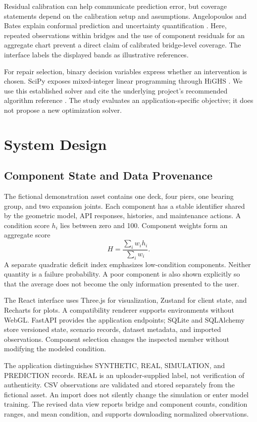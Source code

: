 \documentclass[conference]{IEEEtran}
\begin{document}
Residual calibration can help communicate prediction error, but coverage statements depend on the calibration setup and assumptions. Angelopoulos and Bates explain conformal prediction and uncertainty quantification \cite{angelopoulos}. Here, repeated observations within bridges and the use of component residuals for an aggregate chart prevent a direct claim of calibrated bridge-level coverage. The interface labels the displayed bands as illustrative references.

For repair selection, binary decision variables express whether an intervention is chosen. SciPy exposes mixed-integer linear programming through HiGHS \cite{scipy_milp}. We use this established solver and cite the underlying project's recommended algorithm reference \cite{highs}. The study evaluates an application-specific objective; it does not propose a new optimization solver.

\section{System Design}
\subsection{Component State and Data Provenance}
The fictional demonstration asset contains one deck, four piers, one bearing group, and two expansion joints. Each component has a stable identifier shared by the geometric model, API responses, histories, and maintenance actions. A condition score $h_i$ lies between zero and 100. Component weights form an aggregate score
\begin{equation}
H=\frac{\sum_i w_i h_i}{\sum_i w_i}.
\end{equation}
A separate quadratic deficit index emphasizes low-condition components. Neither quantity is a failure probability. A poor component is also shown explicitly so that the average does not become the only information presented to the user.

The React interface uses Three.js for visualization, Zustand for client state, and Recharts for plots. A compatibility renderer supports environments without WebGL. FastAPI provides the application endpoints; SQLite and SQLAlchemy store versioned state, scenario records, dataset metadata, and imported observations. Component selection changes the inspected member without modifying the modeled condition.

The application distinguishes SYNTHETIC, REAL, SIMULATION, and PREDICTION records. REAL is an uploader-supplied label, not verification of authenticity. CSV observations are validated and stored separately from the fictional asset. An import does not silently change the simulation or enter model training. The revised data view reports bridge and component counts, condition ranges, and mean condition, and supports downloading normalized observations.
\end{document}

